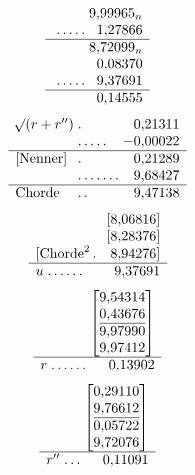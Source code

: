 \[
\begin{array}{l@{\;}l@{\;}r}
&&9{,}99965_n\\
&\mathord{.}\,\mathord{.}\,\mathord{.}\,\mathord{.}\,\mathord{.}&1{,}27866\\\hline
&&8{,}72099_n\\
&&0{,}08370\\
&\mathord{.}\,\mathord{.}\,\mathord{.}\,\mathord{.}\,\mathord{.}&9{,}37691\\\hline
&&0{,}14555
\end{array}
\]
\[
\begin{array}{l@{\;}l@{\;}r}
\BareRoot{(r+r'')}&\mathord{.}&0{,}21311\\
&\mathord{.}\,\mathord{.}\,\mathord{.}\,\mathord{.}\,\mathord{.}&-0{,}00022\\\hline
[\text{Nenner}]&\mathord{.}&0{,}21289\\
&\mathord{.}\,\mathord{.}\,\mathord{.}\,\mathord{.}\,\mathord{.}\,\mathord{.}\,\mathord{.}&9{,}68427\\\hline
\text{Chorde}&\mathord{.}\,\mathord{.}&9{,}47138
\end{array}
\]
\[
\begin{array}{l@{\;}l@{\;}r}
&&[8{,}06816]\\
&&[8{,}28376]\\
\multicolumn{3}{r}{[\text{Chorde}^2\,\mathord{.}\quad8{,}94276]}\\\hline
u&\mathord{.}\,\mathord{.}\,\mathord{.}\,\mathord{.}\,\mathord{.}\,\mathord{.}&9{,}37691
\end{array}
\]
\[
\begin{array}{l@{\;}l@{\;}r}
&&\left[\begin{array}{@{}r@{}}9{,}54314\\0{,}43676\\\hline9{,}97990\\9{,}97412\end{array}\right]\\\hline
r&\mathord{.}\,\mathord{.}\,\mathord{.}\,\mathord{.}\,\mathord{.}\,\mathord{.}&0{,}13902
\end{array}
\]
\[
\begin{array}{l@{\;}l@{\;}r}
&&\left[\begin{array}{@{}r@{}}0{,}29110\\9{,}76612\\\hline0{,}05722\\9{,}72076\end{array}\right]\\\hline
r''&\mathord{.}\,\mathord{.}\,\mathord{.}&0{,}11091
\end{array}
\]
